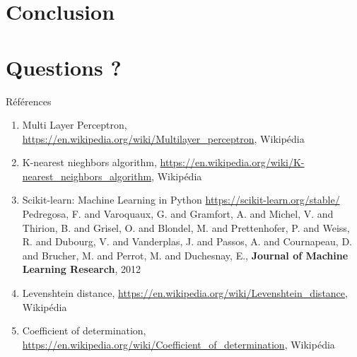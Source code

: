 \documentclass{beamer}
\begin{document}
{\section*{Conclusion}}

{\section*{Questions ?}}

\begin{frame}{Références}
    \begin{enumerate}
        \item Multi Layer Perceptron, \url{https://en.wikipedia.org/wiki/Multilayer_perceptron}, Wikipédia

        \item K-nearest nieghbors algorithm, \url{https://en.wikipedia.org/wiki/K-nearest_neighbors_algorithm}, Wikipédia

        \item Scikit-learn: Machine Learning in Python \url{https://scikit-learn.org/stable/} Pedregosa, F. and Varoquaux, G. and Gramfort, A. and Michel, V. and Thirion, B. and Grisel, O. and Blondel, M. and Prettenhofer, P. and Weiss, R. and Dubourg, V. and Vanderplas, J. and Passos, A. and Cournapeau, D. and Brucher, M. and Perrot, M. and Duchesnay, E., \textbf{Journal of Machine Learning Research}, 2012

        \item Levenshtein distance, \url{https://en.wikipedia.org/wiki/Levenshtein_distance}, Wikipédia

        \item Coefficient of determination, \url{https://en.wikipedia.org/wiki/Coefficient_of_determination}, Wikipédia
    \end{enumerate}
\end{frame}
\end{document}
